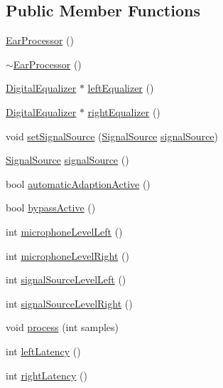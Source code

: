 \subsection*{\-Public \-Member \-Functions}
\begin{DoxyCompactItemize}
\item 
\hyperlink{classEarProcessor_a10ffc09e660dfa8debb698ca769c0510}{\-Ear\-Processor} ()
\item 
\hyperlink{classEarProcessor_a34a5e7c40c82c17d671a3cf23eb3d7b4}{$\sim$\-Ear\-Processor} ()
\item 
\hyperlink{classDigitalEqualizer}{\-Digital\-Equalizer} $\ast$ \hyperlink{classEarProcessor_a88b0b3888fc0b4addaf56809fb4b49cd}{left\-Equalizer} ()
\item 
\hyperlink{classDigitalEqualizer}{\-Digital\-Equalizer} $\ast$ \hyperlink{classEarProcessor_a92c5397f7910d17461c27748be1e3b63}{right\-Equalizer} ()
\item 
void \hyperlink{classEarProcessor_a23946c042c15ef509895fdc7b912e21b}{set\-Signal\-Source} (\hyperlink{classEarProcessor_a4f53a396f0e0611b389c7c86456b5bcd}{\-Signal\-Source} \hyperlink{classEarProcessor_a33cf9c1ea94bea090ae1d0024a56fd47}{signal\-Source})
\item 
\hyperlink{classEarProcessor_a4f53a396f0e0611b389c7c86456b5bcd}{\-Signal\-Source} \hyperlink{classEarProcessor_a33cf9c1ea94bea090ae1d0024a56fd47}{signal\-Source} ()
\item 
bool \hyperlink{classEarProcessor_a262badf2de6296be90bc093dfc4a9ed1}{automatic\-Adaption\-Active} ()
\item 
bool \hyperlink{classEarProcessor_ad5239678f9a915aa8071c500f2ad9545}{bypass\-Active} ()
\item 
int \hyperlink{classEarProcessor_a61a08db1ae5fb61df0b8084210d8a787}{microphone\-Level\-Left} ()
\item 
int \hyperlink{classEarProcessor_a3347a5130ff8904e5c984a5ead56a058}{microphone\-Level\-Right} ()
\item 
int \hyperlink{classEarProcessor_a188f5d3673995e9e78c337023c4dd203}{signal\-Source\-Level\-Left} ()
\item 
int \hyperlink{classEarProcessor_a5a38edd7e3038311bead2c8be56b68d2}{signal\-Source\-Level\-Right} ()
\item 
void \hyperlink{classEarProcessor_a2a65b0d2bafc93871789ff7f750d0565}{process} (int samples)
\item 
int \hyperlink{classEarProcessor_a2a22c5d0fde18acc1c9cd9aaa9fb7dd6}{left\-Latency} ()
\item 
int \hyperlink{classEarProcessor_a1c619eeda07fae7c41fb4a0c4217ac65}{right\-Latency} ()
\end{DoxyCompactItemize}


